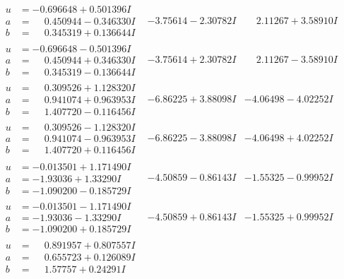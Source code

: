 \documentclass[1p]{elsarticle_modified}
\theoremstyle{definition}
\begin{document}
$$\begin{array}{c|c|c}
\begin{aligned}
u &= -0.696648 + 0.501396 I \\
a &= \phantom{-}0.450944 - 0.346330 I \\
b &= \phantom{-}0.345319 + 0.136644 I\end{aligned}
 & -3.75614 - 2.30782 I & \phantom{-}2.11267 + 3.58910 I \\ \hline\begin{aligned}
u &= -0.696648 - 0.501396 I \\
a &= \phantom{-}0.450944 + 0.346330 I \\
b &= \phantom{-}0.345319 - 0.136644 I\end{aligned}
 & -3.75614 + 2.30782 I & \phantom{-}2.11267 - 3.58910 I \\ \hline\begin{aligned}
u &= \phantom{-}0.309526 + 1.128320 I \\
a &= \phantom{-}0.941074 + 0.963953 I \\
b &= \phantom{-}1.407720 - 0.116456 I\end{aligned}
 & -6.86225 + 3.88098 I & -4.06498 - 4.02252 I \\ \hline\begin{aligned}
u &= \phantom{-}0.309526 - 1.128320 I \\
a &= \phantom{-}0.941074 - 0.963953 I \\
b &= \phantom{-}1.407720 + 0.116456 I\end{aligned}
 & -6.86225 - 3.88098 I & -4.06498 + 4.02252 I \\ \hline\begin{aligned}
u &= -0.013501 + 1.171490 I \\
a &= -1.93036 + 1.33290 I \\
b &= -1.090200 - 0.185729 I\end{aligned}
 & -4.50859 - 0.86143 I & -1.55325 - 0.99952 I \\ \hline\begin{aligned}
u &= -0.013501 - 1.171490 I \\
a &= -1.93036 - 1.33290 I \\
b &= -1.090200 + 0.185729 I\end{aligned}
 & -4.50859 + 0.86143 I & -1.55325 + 0.99952 I \\ \hline\begin{aligned}
u &= \phantom{-}0.891957 + 0.807557 I \\
a &= \phantom{-}0.655723 + 0.126089 I \\
b &= \phantom{-}1.57757 + 0.24291 I\end{aligned}

\end{array}$$
\end{document}

